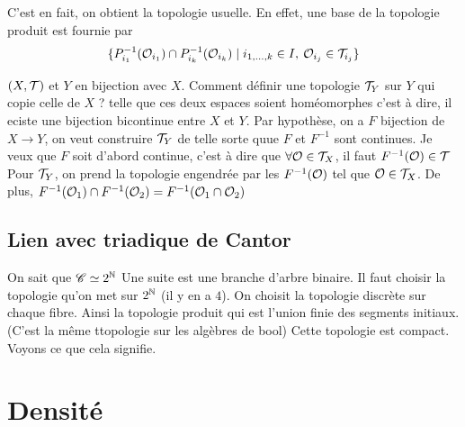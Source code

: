 C'est en fait, on obtient la topologie usuelle. En effet, une base de la topologie produit est fournie par
\[
\{P_{i_1}^{-1}(\mathcal{O}_{i_1})\cap P_{i_k}^{-1}(\mathcal{O} _{i_k}) \mid  i_{1,\dotsc,k}\in I, \: \mathcal{O}_{i_j}\in \mathcal{T}_{i_j}\}
\]
\begin{remarque}
    $(X,\mathcal{T})$ et $Y$ en bijection avec $X$. Comment définir une topologie $\mathcal{T}_Y$ sur $Y$ qui copie celle de $X$ ? telle que ces deux espaces soient homéomorphes c'est à dire, il eciste une bijection bicontinue entre $X$ et $Y$. Par hypothèse, on a $F$ bijection de $X\to  Y$, on veut construire $\mathcal{T}_Y$ de telle sorte quue $F$ et $F^{-1}$ sont continues.
    Je veux que $F$ soit d'abord continue, c'est à dire que $\forall \mathcal{O} \in \mathcal{T}_X$, il faut $F^{-1}(\mathcal{O})\in \mathcal{T}$ Pour $\mathcal{T}_Y$, on prend la topologie engendrée par les $F^{-1}(\mathcal{O})$ tel que $\mathcal{O} \in \mathcal{T}_X$. De plus, $F^{-1}(\mathcal{O} _1)\cap F^{-1}(\mathcal{O}_2)= F^{-1}(\mathcal{O}_1\cap \mathcal{O}_2)$
 \end{remarque}

 \subsection{Lien avec triadique de Cantor}

 On sait que $\mathscr C \simeq 2^{\mathbb{N}}$ Une suite est une branche d'arbre binaire. Il faut choisir la topologie qu'on met sur $2^{\mathbb{N}}$ (il y en a $4$). On choisit la topologie discrète sur chaque fibre. Ainsi la topologie produit qui est l'union finie des segments initiaux. (C'est la même ttopologie sur les algèbres de bool) Cette topologie est compact. Voyons ce que cela signifie.

 



 \section{Densité}


